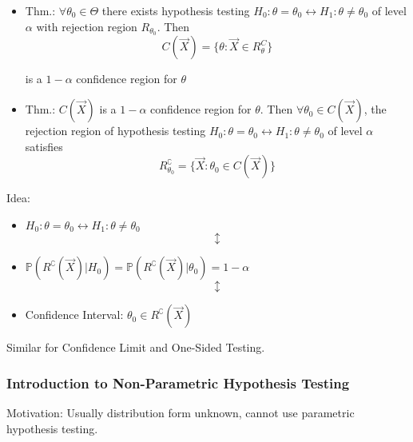 \begin{itemize}
    \item Thm.: $\forall\theta_0\in\Theta$ there exists hypothesis testing $H_0:\theta=\theta_0\longleftrightarrow H_1:\theta\neq\theta_0$ of level $\alpha$ with rejection region $R_{\theta_0}$. Then
    \begin{equation}
        C(\vec{X})=\{\theta:\vec{X}\in R^C_{\theta}\}
    \end{equation}

    is a $1-\alpha$ confidence region for $\theta$

    \item Thm.: $C(\vec{X})$ is a $1-\alpha$ confidence region for $\theta$. Then $\forall\theta_0\in C(\vec{X})$, the rejection region of hypothesis testing $H_0:\theta=\theta_0\longleftrightarrow H_1:\theta\neq\theta_0$ of level $\alpha$ satisfies
    \begin{equation}
    R^\complement_{\theta_0}=\{\vec{X}:\theta_0\in C(\vec{X})\}
    \end{equation}
\end{itemize}
    
    \begin{point}
        Idea:
    \end{point}
    
        
\begin{itemize}[itemsep=-3pt]
    \item[] \centering $H_0:\theta=\theta_0\longleftrightarrow H_1:\theta\neq\theta_0$
    \begin{equation*}\updownarrow\end{equation*}
    \item[] \centering $\mathbb{P}(R^\complement(\vec{X})|H_0)=\mathbb{P}(R^\complement(\vec{X})|\theta_0)=1-\alpha$
    \begin{equation*}\updownarrow\end{equation*}
    \item[] Confidence Interval: $\theta_0\in R^\complement(\vec{X})$
\end{itemize}

    Similar for Confidence Limit and One-Sided Testing.

\subsubsection{Introduction to Non-Parametric Hypothesis Testing}\label{SubSectionIntroToNonParametricHypothesisTesting}

    Motivation: Usually distribution form unknown, cannot use parametric hypothesis testing.

